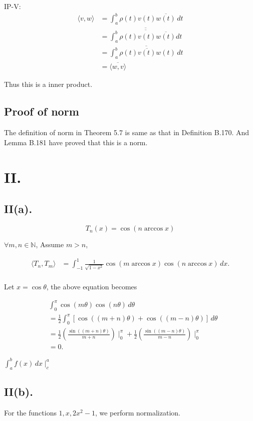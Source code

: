 \documentclass[a4paper]{article}
\begin{document}
IP-V:
\begin{align*}
\langle v, w \rangle &= \int_a^b \rho(t) v(t) \overline{w(t)} \, dt \\
&= \overline{\overline{\int_a^b \rho(t) v(t) \overline{w(t)}dt}} \,  \\
&= \overline{\int_a^b \rho(t) \overline{v(t)} w(t) \, dt} \\
&= \overline{\langle w, v \rangle}
\end{align*}

Thus this is a inner product.

\subsection*{Proof of norm}
The definition of norm in Theorem 5.7 is same as that in Definition B.170.
And Lemma B.181 have proved that this is a norm.

\section*{II.}

\subsection*{II(a).}

$$T_n(x) = \cos(n \arccos x)$$

$\forall m, n \in \mathbb{N}$, Assume $m > n$,

\begin{align*}
\langle T_n, T_m \rangle &= \int_{-1}^{1} \frac{1}{\sqrt{1-x^2}} \cos(m \arccos x) \cos(n \arccos x) \, dx .\\
\end{align*}

Let $ x = \cos \theta$, the above equation becomes

\begin{align*}
& \int_{0}^{\pi} \cos(m\theta) \cos(n\theta) \, d\theta \\
&= \frac{1}{2} \int_{0}^{\pi} \left[ \cos((m+n)\theta) + \cos((m-n)\theta) \right] \, d\theta \\
&= \frac{1}{2} ( \frac{\sin((m+n)\theta)}{m+n} )\mid_0^{\pi} + \frac{1}{2} ( \frac{\sin((m-n)\theta)}{m-n} ) \mid_0^{\pi} \\
&= 0.
\end{align*}

$\int_{a}^{b} f(x) \, dx \mid_c^a$

\subsection*{II(b).}
For the functions \(1, x, 2x^2 - 1\), we perform normalization.
\end{document}
